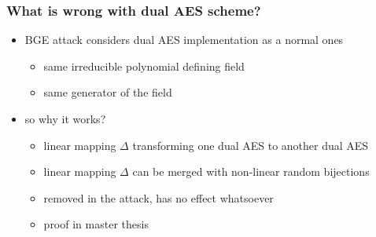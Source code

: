 \documentclass{beamer}
\begin{document}
\begin{frame}
    \frametitle{What is wrong with dual AES scheme?}
    \begin{itemize}
     \item BGE attack considers dual AES implementation as a normal ones
     \begin{itemize}
      \item same irreducible polynomial defining field
      \item same generator of the field
     \end{itemize}
     \item so why it works?
     \begin{itemize}
      \item \alert{linear} mapping $\Delta$ transforming one dual AES to another dual AES
      \item \alert<+>{linear} mapping $\Delta$ can be merged with non-linear random bijections
      \item removed in the attack, has \alert{no effect} whatsoever
      \item proof in master thesis
     \end{itemize}
    \end{itemize}
    
    \centerline{}
\end{frame}
\end{document}

